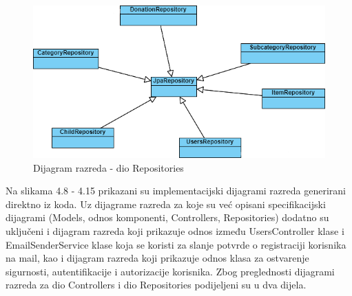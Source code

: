 			\begin{figure}[H]
				\includegraphics[width=\textwidth,height=0.4\textheight]{dijagrami/Repozitoriji.png}
				\centering
				\caption{Dijagram razreda - dio Repositories}
				\label{fig:Repositories}
			\end{figure}


                Na slikama 4.8 - 4.15 prikazani su implementacijski dijagrami razreda generirani direktno iz koda. Uz dijagrame razreda za koje su već opisani specifikacijski dijagrami (Models, odnos komponenti, Controllers, Repositories) dodatno su uključeni i dijagram razreda koji prikazuje odnos između UsersController klase i EmailSenderService klase koja se koristi za slanje potvrde o registraciji korisnika na mail, kao i dijagram razreda koji prikazuje odnos klasa za ostvarenje sigurnosti, autentifikacije i autorizacije korisnika. Zbog preglednosti dijagrami razreda za dio Controllers i dio Repositories podijeljeni su u dva dijela.
			
			\eject

